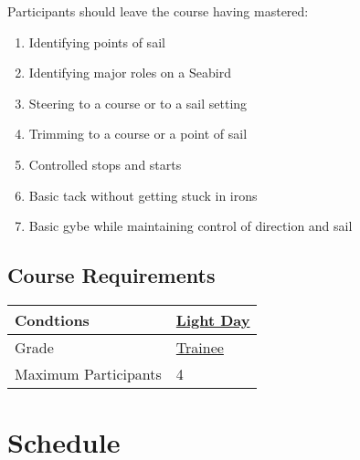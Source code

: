 \documentclass[12pt]{scrartcl}
\begin{document}
Participants should leave the course having mastered:

\label{list:goals}
\begin{enumerate}
	\item Identifying points of sail
	\item Identifying major roles on a Seabird
	\item Steering to a course or to a sail setting
	\item Trimming to a course or a point of sail
	\item Controlled stops and starts
	\item Basic tack without getting stuck in irons
	\item Basic gybe while maintaining control of direction and sail
\end{enumerate}

\subsection{Course Requirements} \label{subsec:requirements}

\label{tab:requirements}
\begin{tabular}{|l|l|}
	\hline
	Condtions & \hyperlink{condition:light}{Light Day} \\
	\hline
	Grade & \hyperlink{grade:trainee}{Trainee} \\
	\hline
	Maximum Participants & 4 \\
	\hline
\end{tabular}

\section{Schedule} \label{sec:schedule}
\end{document}
